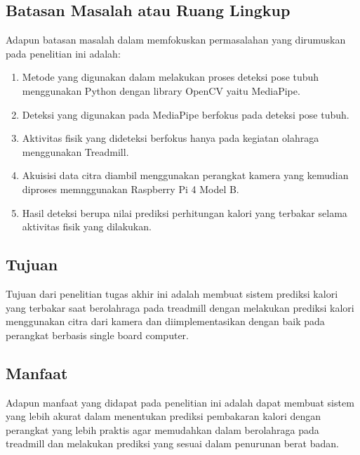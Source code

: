 \subsection{Batasan Masalah atau Ruang Lingkup}

Adapun batasan masalah dalam memfokuskan permasalahan yang dirumuskan pada penelitian ini adalah:

\begin{enumerate}[nolistsep]

    \item Metode yang digunakan dalam melakukan proses deteksi pose tubuh menggunakan Python dengan library OpenCV yaitu MediaPipe.
  
    \item Deteksi yang digunakan pada MediaPipe berfokus pada deteksi pose tubuh.
  
    \item Aktivitas fisik yang dideteksi berfokus hanya pada kegiatan olahraga menggunakan Treadmill.
    
    \item Akuisisi data citra diambil menggunakan perangkat kamera yang kemudian diproses memnggunakan Raspberry Pi 4 Model B.
    
    \item Hasil deteksi berupa nilai prediksi perhitungan kalori yang terbakar selama aktivitas fisik yang dilakukan.
  
  \end{enumerate}

\subsection{Tujuan}

Tujuan dari penelitian tugas akhir ini adalah membuat sistem prediksi kalori yang terbakar saat berolahraga pada treadmill dengan melakukan prediksi kalori menggunakan citra dari kamera dan diimplementasikan dengan baik pada perangkat berbasis single board computer.

\subsection{Manfaat}

Adapun manfaat yang didapat pada penelitian ini adalah dapat membuat sistem yang lebih akurat dalam menentukan prediksi pembakaran kalori dengan perangkat yang lebih praktis agar memudahkan dalam berolahraga pada treadmill dan melakukan prediksi yang sesuai dalam penurunan berat badan.
